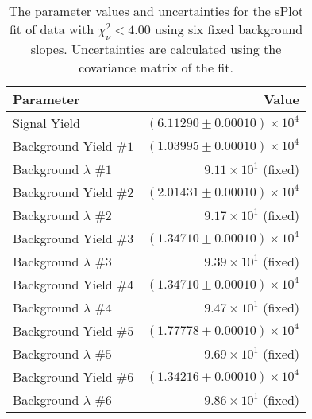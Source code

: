 
\begin{table}[ht]
    \begin{center}
        \begin{tabular}{lr}\toprule
            Parameter & Value \\\midrule
            Signal Yield & $(6.11290 \pm 0.00010) \times 10^{4}$ \\
            Background Yield $\#1$ & $(1.03995 \pm 0.00010) \times 10^{4}$ \\
            Background $\lambda$ $\#1$ & $9.11 \times 10^{1}$ (fixed) \\
            Background Yield $\#2$ & $(2.01431 \pm 0.00010) \times 10^{4}$ \\
            Background $\lambda$ $\#2$ & $9.17 \times 10^{1}$ (fixed) \\
            Background Yield $\#3$ & $(1.34710 \pm 0.00010) \times 10^{4}$ \\
            Background $\lambda$ $\#3$ & $9.39 \times 10^{1}$ (fixed) \\
            Background Yield $\#4$ & $(1.34710 \pm 0.00010) \times 10^{4}$ \\
            Background $\lambda$ $\#4$ & $9.47 \times 10^{1}$ (fixed) \\
            Background Yield $\#5$ & $(1.77778 \pm 0.00010) \times 10^{4}$ \\
            Background $\lambda$ $\#5$ & $9.69 \times 10^{1}$ (fixed) \\
            Background Yield $\#6$ & $(1.34216 \pm 0.00010) \times 10^{4}$ \\
            Background $\lambda$ $\#6$ & $9.86 \times 10^{1}$ (fixed) \\\bottomrule
        \end{tabular}
        \caption{The parameter values and uncertainties for the sPlot fit of data with $\chi^2_\nu < 4.00$ using six fixed background slopes. Uncertainties are calculated using the covariance matrix of the fit.}\label{tab:splot-fit-results-chisqdof-4.00-fixed-6}
    \end{center}
\end{table}
